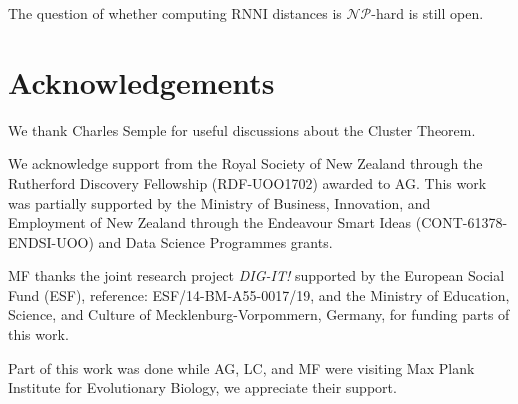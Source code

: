 \documentclass{amsart}
\newcommand{\np}{\mathcal{NP}}
\newcommand{\rnni}{\mathrm{RNNI}}
\begin{document}
The question of whether computing $\rnni$ distances is $\np$-hard is still open.


\section*{Acknowledgements}
We thank Charles Semple for useful discussions about the Cluster Theorem.

We acknowledge support from the Royal Society of New Zealand through the Rutherford Discovery Fellowship (RDF-UOO1702) awarded to AG.
This work was partially supported by the Ministry of Business, Innovation, and Employment of New Zealand through the Endeavour Smart Ideas (CONT-61378-ENDSI-UOO) and Data Science Programmes grants.

MF thanks the joint research project \textit{DIG-IT!} supported by the European Social Fund (ESF), reference: ESF/14-BM-A55-0017/19, and the Ministry of Education, Science, and Culture of Mecklenburg-Vorpommern, Germany, for funding parts of this work.

Part of this work was done while AG, LC, and MF were visiting Max Plank Institute for Evolutionary Biology, we appreciate their support.


\printbibliography
\end{document}
